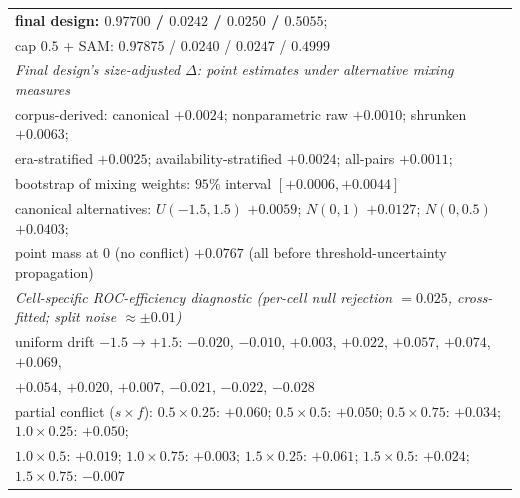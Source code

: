 \documentclass[11pt]{article}
\begin{document}
\begin{table}[htbp]
\begin{tabular}{lcccc}
{\quad \textbf{final design: $0.97700$ / $0.0242$ / $0.0250$ /
$0.5055$};}\\
\multicolumn{5}{l}{cap $0.5$ + SAM: $0.97875$ / $0.0240$ / $0.0247$ /
$0.4999$}\\
\hline
\multicolumn{5}{l}{\emph{Final design's size-adjusted $\Delta$: point
estimates under alternative mixing measures}}\\
\multicolumn{5}{l}{corpus-derived: canonical $+0.0024$; nonparametric raw
$+0.0010$; shrunken $+0.0063$;}\\
\multicolumn{5}{l}{\quad era-stratified $+0.0025$; availability-stratified
$+0.0024$; all-pairs $+0.0011$;}\\
\multicolumn{5}{l}{\quad bootstrap of mixing weights: $95\%$ interval
$[+0.0006, +0.0044]$}\\
\multicolumn{5}{l}{canonical alternatives: $U(-1.5,1.5)$ $+0.0059$;
$N(0,1)$ $+0.0127$; $N(0,0.5)$ $+0.0403$;}\\
\multicolumn{5}{l}{\quad point mass at $0$ (no conflict) $+0.0767$
\quad (all before threshold-uncertainty propagation)}\\
\hline
\multicolumn{5}{l}{\emph{Cell-specific ROC-efficiency diagnostic
(per-cell null rejection $=0.025$, cross-fitted; split noise
$\approx\pm0.01$)}}\\
\multicolumn{5}{l}{uniform drift $-1.5\to+1.5$: $-0.020$, $-0.010$,
$+0.003$, $+0.022$, $+0.057$, $+0.074$, $+0.069$,}\\
\multicolumn{5}{l}{\quad $+0.054$, $+0.020$, $+0.007$, $-0.021$,
$-0.022$, $-0.028$}\\
\multicolumn{5}{l}{partial conflict ($s \times f$): $0.5{\times}0.25$:
$+0.060$; $0.5{\times}0.5$: $+0.050$; $0.5{\times}0.75$: $+0.034$;
$1.0{\times}0.25$: $+0.050$;}\\
\multicolumn{5}{l}{\quad $1.0{\times}0.5$: $+0.019$; $1.0{\times}0.75$:
$+0.003$; $1.5{\times}0.25$: $+0.061$; $1.5{\times}0.5$: $+0.024$;
$1.5{\times}0.75$: $-0.007$}\\
\hline
\end{tabular}
\end{table}
\end{document}
